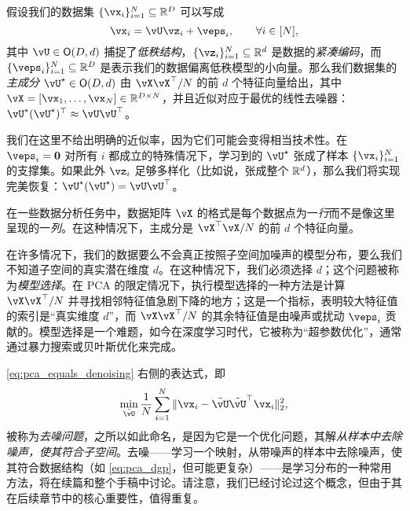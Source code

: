 \documentclass[../../book-main_zh.tex]{subfiles}
\begin{document}
\begin{theorem}\label{thm:pca}
    假设我们的数据集 \(\{\vx_{i}\}_{i = 1}^{N} \subseteq \R^{D}\) 可以写成
    \begin{equation}
        \vx_{i} = \vU\vz_{i} + \veps_{i}, \qquad \forall i \in [N],
    \end{equation}
    其中 \(\vU \in \O(D, d)\) 捕捉了\textit{低秩结构}，\(\{\vz_{i}\}_{i = 1}^{N} \subseteq \R^{d}\) 是数据的\textit{紧凑编码}，而 \(\{\veps_{i}\}_{i = 1}^{N} \subseteq \R^{D}\) 是表示我们的数据偏离低秩模型的小向量。那么我们数据集的\textit{主成分} \(\vU^{\star} \in \O(D, d)\) 由 \(\vX\vX^{\top}/N\) 的前 \(d\) 个特征向量给出，其中 \(\vX = [\vx_{1}, \dots, \vx_{N}] \in \R^{D \times N}\)，并且近似对应于最优的线性去噪器：\(\vU^{\star}(\vU^{\star})^{\top} \approx \vU\vU^{\top}\)。
\end{theorem}
我们在这里不给出明确的近似率，因为它们可能会变得相当技术性。在 \(\veps_{i} = \vzero\) 对所有 \(i\) 都成立的特殊情况下，学习到的 \(\vU^{\star}\) 张成了样本 \(\{\vx_{i}\}_{i = 1}^{N}\) 的支撑集。如果此外 \(\vz_{i}\) 足够多样化（比如说，张成整个 \(\mathbb{R}^{d}\)），那么我们将实现完美恢复：\(\vU^{\star}(\vU^{\star}) = \vU\vU^{\top}\)。


\begin{remark}
    在一些数据分析任务中，数据矩阵 \(\vX\) 的格式是每个数据点为一\textit{行}而不是像这里呈现的一\textit{列}。在这种情况下，主成分是 \(\vX^{\top}\vX/N\) 的前 \(d\) 个特征向量。
\end{remark}


\begin{remark}[通过去噪特征值选择基]
    在许多情况下，我们的数据要么不会真正按照子空间加噪声的模型分布，要么我们不知道子空间的真实潜在维度 \(d\)。在这种情况下，我们必须选择 \(d\)；这个问题被称为\textit{模型选择}。在 PCA 的限定情况下，执行模型选择的一种方法是计算 \(\vX\vX^{\top}/N\) 并寻找相邻特征值急剧下降的地方；这是一个指标，表明较大特征值的索引是“真实维度 \(d\)”，而 \(\vX\vX^{\top}/N\) 的其余特征值是由噪声或扰动 \(\veps_{i}\) 贡献的。模型选择是一个难题，如今在深度学习时代，它被称为“超参数优化”，通常通过暴力搜索或贝叶斯优化来完成。%
\end{remark}

\begin{remark}[去噪样本]
    \eqref{eq:pca_equals_denoising} 右侧的表达式，即
    \begin{equation}\label{eq:orthogonal_denoising}
        \min_{\tilde{\vU}}\frac{1}{N}\sum_{i = 1}^{N}\norm{\vx_{i} - \tilde{\vU}\tilde{\vU}^{\top}\vx_{i}}_{2}^{2},
    \end{equation}
    被称为\textit{去噪问题}，之所以如此命名，是因为它是一个优化问题，其解\textit{从样本中去除噪声，使其符合子空间}。去噪——学习一个映射，从带噪声的样本中去除噪声，使其符合数据结构（如 \eqref{eq:pca_dgp}，但可能更复杂）——是学习分布的一种常用方法，将在续篇和整个手稿中讨论。请注意，我们已经讨论过这个概念，但由于其在后续章节中的核心重要性，值得重复。
\end{remark}
\end{document}
